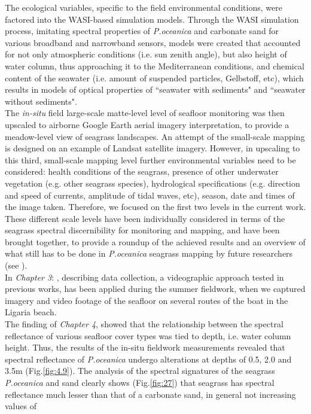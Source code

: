 \documentclass[11pt]{article}
\begin{document}
The ecological variables, specific to the field environmental conditions, were factored into the \ac{WASI}-based simulation models. Through the \ac{WASI} simulation process, imitating spectral properties of \textit{P.oceanica} and carbonate sand for various broadband and narrowband sensors, models were created that accounted for not only atmospheric conditions (i.e. sun zenith angle), but also height of water column, thus approaching it to the Mediterranean conditions, and chemical content of the seawater (i.e. amount of suspended particles, Gelbstoff, etc), which results in models of optical properties of ``seawater with sediments" and ``seawater without sediments".\\
The \textit{in-situ} field large-scale matte-level level of seafloor monitoring was then upscaled to airborne Google Earth aerial imagery interpretation, to provide a meadow-level view of seagrass landscapes. An attempt of the small-scale mapping is designed on an example of Landsat satellite imagery. However, in upscaling to this third, small-scale mapping level further environmental variables need to be considered: health conditions of the seagrass, presence of other underwater vegetation (e.g. other seagrass species), hydrological specifications (e.g. direction and speed of currents, amplitude of tidal waves, etc), season, date and times of the image taken. Therefore, we focused on the first two levels in the current work. These different scale levels have been individually considered in terms of the seagrass spectral discernibility for monitoring and mapping, and have been brought together, to provide a roundup of the achieved results and an overview of what still has to be done in \textit{P.oceanica} seagrass mapping by future researchers (see ). \vspace{1ex}\\
In \textit{Chapter 3}: , describing data collection, a videographic approach tested in previous works, has been applied during the summer fieldwork, when we captured imagery and video footage of the seafloor on several routes of the boat in the Ligaria beach.\\
The finding of \textit{Chapter 4},  showed that the relationship between the spectral reflectance of various seafloor cover types was tied to depth, i.e. water column height. Thus, the results of the in-situ fieldwork measurements revealed that spectral reflectance of \textit{P.oceanica} undergo alterations at depths of 0.5, 2.0 and 3.5m (Fig.\ref{fig:4.9}). The analysis of the spectral signatures of the seagrass \textit{P.oceanica} and sand clearly shows (Fig.\ref{fig:27}) that seagrass has spectral reflectance much lesser than that of a carbonate sand, in general not increasing values of
\end{document}
